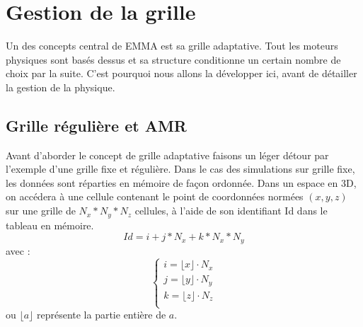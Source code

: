 %

\section{Gestion de la grille}
\label{sec_gestion_grille}

Un des concepts central de EMMA est sa grille adaptative.
Tout les moteurs physiques sont basés dessus et sa structure conditionne un certain nombre de choix par la suite.
C'est pourquoi nous allons la développer ici, avant de détailler la gestion de la physique. 

\subsection{Grille régulière et AMR}
Avant d'aborder le concept de grille adaptative faisons un léger détour par l'exemple d'une grille fixe et régulière.
Dans le cas des simulations sur grille fixe, les données sont réparties en mémoire de façon ordonnée.
Dans un espace en 3D, on accédera à une cellule contenant le point de coordonnées normées $(x,y,z)$ sur une grille de $N_x*N_y*N_z$ cellules, à l'aide de son identifiant Id dans le tableau en mémoire.
\begin{equation}
Id = i + j*N_x + k * N_x*N_y
\end{equation}
avec :
\begin{equation}
\begin{cases}
i=\lfloor x \rfloor \cdot N_x \\
j=\lfloor y \rfloor \cdot N_y \\
k=\lfloor z \rfloor \cdot N_z \\
\end{cases}
\end{equation}
ou $\lfloor a \rfloor$ représente la partie entière de $a$.

